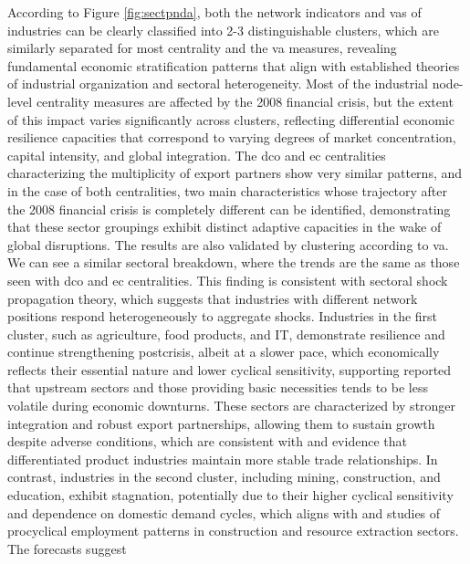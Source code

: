 \documentclass[preprint, 3p,
authoryear]{elsarticle} %
\begin{document}
According to Figure \ref{fig:sectpnda}, both the network indicators and
\glspl{va} of industries can be clearly classified into 2-3
distinguishable clusters, which are similarly separated for most
centrality and the \gls{va} measures, revealing fundamental economic
stratification patterns that align with established theories of
industrial organization and sectoral heterogeneity. Most of the
industrial node-level centrality measures are affected by the 2008
financial crisis, but the extent of this impact varies significantly
across clusters, reflecting differential economic resilience capacities
that correspond to varying degrees of market concentration, capital
intensity, and global integration. The \gls{dco} and \gls{ec}
centralities characterizing the multiplicity of export partners show
very similar patterns, and in the case of both centralities, two main
characteristics whose trajectory after the 2008 financial crisis is
completely different can be identified, demonstrating that these sector
groupings exhibit distinct adaptive capacities in the wake of global
disruptions. The results are also validated by clustering according to
\gls{va}. We can see a similar sectoral breakdown, where the trends are
the same as those seen with \gls{dco} and \gls{ec} centralities. This
finding is consistent with \citet{carvalho2014micro} sectoral shock
propagation theory, which suggests that industries with different
network positions respond heterogeneously to aggregate shocks.
Industries in the first cluster, such as agriculture, food products, and
IT, demonstrate resilience and continue strengthening postcrisis, albeit
at a slower pace, which economically reflects their essential nature and
lower cyclical sensitivity, supporting \citet{acemoglu2012network}
reported that upstream sectors and those providing basic necessities
tends to be less volatile during economic downturns. These sectors are
characterized by stronger integration and robust export partnerships,
allowing them to sustain growth despite adverse conditions, which are
consistent with \citet{rauch2003starting} and \citet{roner2025survival}
evidence that differentiated product industries maintain more stable
trade relationships. In contrast, industries in the second cluster,
including mining, construction, and education, exhibit stagnation,
potentially due to their higher cyclical sensitivity and dependence on
domestic demand cycles, which aligns with \citet{davis2001sectoral} and
\citet{goswami2025job} studies of procyclical employment patterns in
construction and resource extraction sectors. The forecasts suggest
\end{document}
